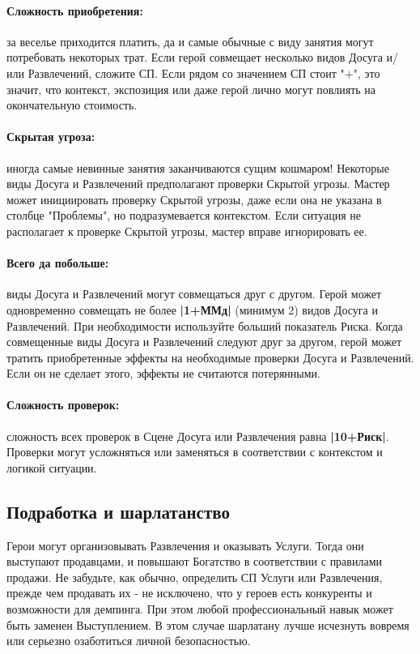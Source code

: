 \paragraph{Сложность приобретения:} за веселье приходится платить, да и самые обычные с виду занятия могут потребовать некоторых трат. Если герой совмещает несколько видов Досуга и/ или Развлечений, сложите СП. 
\newline Если рядом со значением СП стоит "+", это значит, что контекст, экспозиция или даже герой лично могут повлиять на окончательную стоимость.
\paragraph{Скрытая угроза:} иногда самые невинные занятия заканчиваются сущим кошмаром! Некоторые виды Досуга и Развлечений предполагают проверки Скрытой угрозы. Мастер может инициировать проверку Скрытой угрозы, даже если она не указана в столбце "Проблемы", но подразумевается контекстом. Если ситуация не располагает к проверке Скрытой угрозы, мастер вправе игнорировать ее.
\paragraph{Всего да побольше:} виды Досуга и Развлечений могут совмещаться друг с другом. Герой может одновременно совмещать не более \textbf{|1+ММд|} (минимум 2) видов Досуга и Развлечений. При необходимости используйте больший показатель Риска.
\newline Когда совмещенные виды Досуга и Развлечений следуют друг за другом, герой может тратить приобретенные эффекты на необходимые проверки Досуга и Развлечений. Если он не сделает этого, эффекты не считаются потерянными.
\paragraph{Сложность проверок:} сложность всех проверок в Сцене Досуга или Развлечения равна \textbf{|10+Риск|}. Проверки могут усложняться или заменяться в соответствии с контекстом и логикой ситуации.

\subsection{Подработка и шарлатанство}
Герои могут организовывать Развлечения и оказывать Услуги. Тогда они выступают продавцами, и повышают Богатство в соответствии с правилами продажи. Не забудьте, как обычно, определить СП Услуги или Развлечения, прежде чем продавать их - не исключено, что у героев есть конкуренты и возможности для демпинга.
\newline При этом любой профессиональный навык может быть заменен Выступлением. В этом случае шарлатану лучше исчезнуть вовремя или серьезно озаботиться личной безопасностью.
